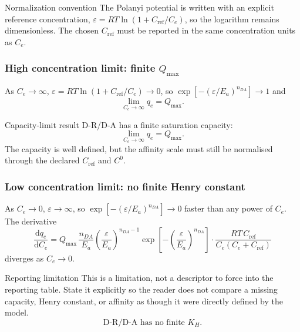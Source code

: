\documentclass[journal=jacsat,manuscript=article]{achemso}
\begin{document}
\begin{bluebox}{Normalization convention}
The Polanyi potential is written with an explicit reference concentration,
\(\varepsilon = RT\ln(1+C_{\mathrm{ref}}/C_e)\), so the logarithm remains
dimensionless. The chosen \(C_{\mathrm{ref}}\) must be reported in the same
concentration units as \(C_e\).
\end{bluebox}

\subsubsection{High concentration limit: finite $Q_{\max}$}

As $C_e \to \infty$, $\varepsilon = RT\ln(1+C_{\mathrm{ref}}/C_e) \to 0$, so
$\exp[-(\varepsilon/E_a)^{n_{DA}}] \to 1$ and
\begin{equation}
	\lim_{C_e \to \infty} q_e = Q_{\max}.
\end{equation}
\begin{greenbox}{Capacity-limit result}
	D-R/D-A has a finite saturation capacity:
	\begin{equation}
		\lim_{C_e \to \infty} q_e = Q_{\max}.
	\end{equation}
	The capacity is well defined, but the affinity scale must still be
	normalised through the declared \(C_{\mathrm{ref}}\) and \(C^0\).
\end{greenbox}

\subsubsection{Low concentration limit: no finite Henry constant}

As $C_e \to 0$, $\varepsilon \to \infty$, so
$\exp[-(\varepsilon/E_a)^{n_{DA}}] \to 0$ faster than any power of $C_e$. The derivative
\begin{equation}
	\frac{\mathrm{d}q_e}{\mathrm{d}C_e}
	= Q_{\max}\, \frac{n_{DA}}{E_a}
	\left(\frac{\varepsilon}{E_a}\right)^{n_{DA}-1}
	\exp\!\left[-\left(\frac{\varepsilon}{E_a}\right)^{n_{DA}}\right]
	\cdot \frac{RT\,C_{\mathrm{ref}}}{C_e(C_e+C_{\mathrm{ref}})}
\end{equation}
diverges as $C_e \to 0$.
\begin{redbox}{Reporting limitation}
	This is a limitation, not a descriptor to force into the reporting table. State it explicitly so the reader does not compare a missing capacity, Henry constant, or affinity as though it were directly defined by the model.
\begin{equation}
	\text{D-R/D-A has no finite } K_H.
\end{equation}
\end{redbox}
\end{document}
